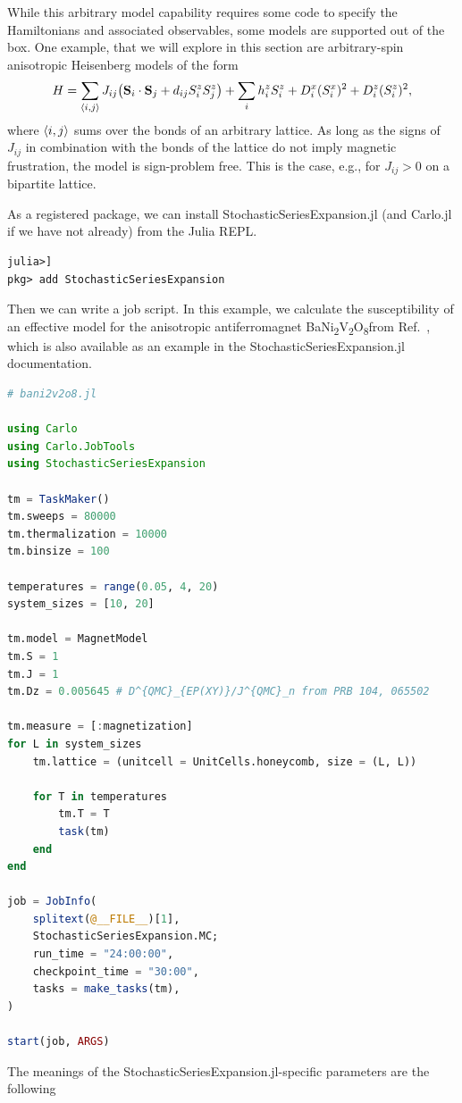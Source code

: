 \documentclass{SciPost}
\newcommand\banivo{BaNi\textsubscript{2}V\textsubscript{2}O\textsubscript{8}}
\begin{document}
While this arbitrary model capability requires some code to specify the Hamiltonians and associated observables, some models are supported out of the box. One example, that we will explore in this section are arbitrary-spin anisotropic Heisenberg models of the form
\begin{equation}
\label{eq:heisenberg}
H = \sum_{\braket{i,j}} J_{ij} \qty(\vb S_i \cdot \vb S_j + d_{ij} S^z_i S^z_j) + \sum_i h_i^z S^z_i + D^x_i (S^x_i)^2 + D^z_i (S^z_i)^2,
\end{equation}
where $\braket{i,j}$ sums over the bonds of an arbitrary lattice. As long as the signs of $J_{ij}$ in combination with the bonds of the lattice do not imply magnetic frustration, the model is sign-problem free. This is the case, e.g., for $J_{ij} > 0$ on a bipartite lattice.

As a registered package, we can install StochasticSeriesExpansion.jl (and Carlo.jl if we have not already) from the Julia REPL.
\begin{lstlisting}
julia>]
pkg> add StochasticSeriesExpansion
\end{lstlisting}
Then we can write a job script. In this example, we calculate the susceptibility of an effective model for the anisotropic antiferromagnet \banivo from Ref.~\cite{Klyushina2021}, which is also available as an example in the StochasticSeriesExpansion.jl documentation.
\begin{lstlisting}[language=julia]
# bani2v2o8.jl

using Carlo
using Carlo.JobTools
using StochasticSeriesExpansion

tm = TaskMaker()
tm.sweeps = 80000
tm.thermalization = 10000
tm.binsize = 100

temperatures = range(0.05, 4, 20)
system_sizes = [10, 20]

tm.model = MagnetModel
tm.S = 1
tm.J = 1
tm.Dz = 0.005645 # D^{QMC}_{EP(XY)}/J^{QMC}_n from PRB 104, 065502 

tm.measure = [:magnetization]
for L in system_sizes
    tm.lattice = (unitcell = UnitCells.honeycomb, size = (L, L))

    for T in temperatures
        tm.T = T
        task(tm)
    end
end

job = JobInfo(
    splitext(@__FILE__)[1],
    StochasticSeriesExpansion.MC;
    run_time = "24:00:00",
    checkpoint_time = "30:00",
    tasks = make_tasks(tm),
)

start(job, ARGS)
\end{lstlisting}
The meanings of the StochasticSeriesExpansion.jl-specific parameters are the following
\end{document}
